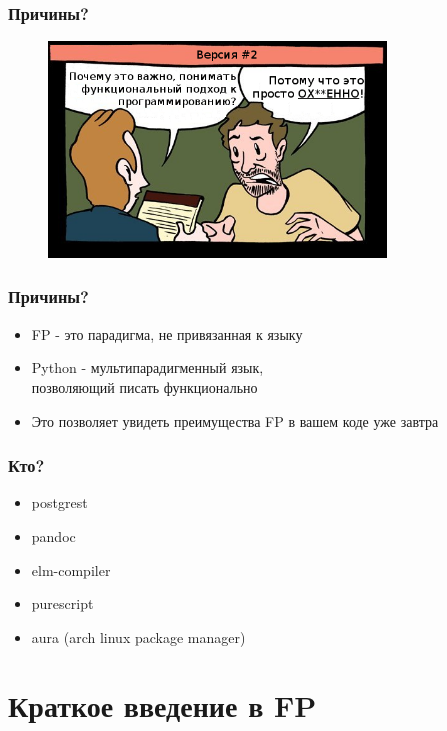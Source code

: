 \documentclass[18pt, compress, aspectratio=169]{beamer}
\begin{document}
\begin{frame}
    \frametitle{Причины?}
    \vspace{-25pt}
    \begin{figure}
        \includegraphics[width=0.8\textwidth,center]{second_option.png}
    \end{figure}
\end{frame}

\begin{frame}[fragile]
    \frametitle{Причины?}
    \begin{itemize}[label={\MVRightarrow}]
        \item FP - это парадигма, не привязанная к языку
        \item Python - мультипарадигменный язык,\\ позволяющий писать функционально
        \item Это позволяет увидеть преимущества FP в вашем коде уже завтра
    \end{itemize}
\end{frame}

\begin{frame}[fragile]
    \frametitle{Кто?}
    \begin{itemize}[label={\MVRightarrow}]
        \item postgrest
        \item pandoc
        \item elm-compiler
        \item purescript
        \item aura (arch linux package manager)
    \end{itemize}
\end{frame}

\section{Краткое введение в FP}
\end{document}
